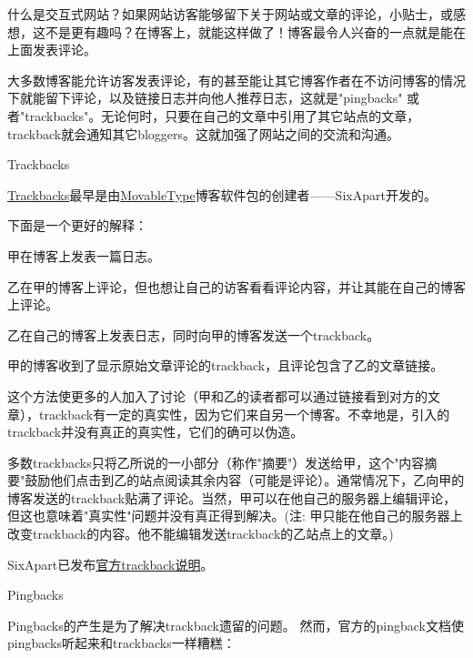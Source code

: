 什么是交互式网站？如果网站访客能够留下关于网站或文章的评论，小贴士，或感想，这不是更有趣吗？在博客上，就能这样做了！博客最令人兴奋的一点就是能在上面发表评论。

大多数博客能允许访客发表评论，有的甚至能让其它博客作者在不访问博客的情况下就能留下评论，以及链接日志并向他人推荐日志，这就是"pingbacks" 或者"trackbacks"。无论何时，只要在自己的文章中引用了其它站点的文章， trackback就会通知其它bloggers。这就加强了网站之间的交流和沟通。

\begin{compactenum}
\item Trackbacks

\href{http://codex.wordpress.org/Glossary#Trackback}{Trackbacks}最早是由\href{http://www.movabletype.org/}{MovableType}博客软件包的创建者——SixApart开发的。


下面是一个更好的解释：
\begin{compactitem}
\item 甲在博客上发表一篇日志。
\item 乙在甲的博客上评论，但也想让自己的访客看看评论内容，并让其能在自己的博客上评论。
\item 乙在自己的博客上发表日志，同时向甲的博客发送一个trackback。
\item 甲的博客收到了显示原始文章评论的trackback，且评论包含了乙的文章链接。
\end{compactitem}

这个方法使更多的人加入了讨论（甲和乙的读者都可以通过链接看到对方的文章），trackback有一定的真实性，因为它们来自另一个博客。不幸地是，引入的trackback并没有真正的真实性，它们的确可以伪造。

多数trackbacks只将乙所说的一小部分（称作"摘要"）发送给甲，这个"内容摘要"鼓励他们点击到乙的站点阅读其余内容（可能是评论）。通常情况下，乙向甲的博客发送的trackback贴满了评论。当然，甲可以在他自己的服务器上编辑评论，但这也意味着"真实性"问题并没有真正得到解决。(注: 甲只能在他自己的服务器上改变trackback的内容。他不能编辑发送trackback的乙站点上的文章。)

SixApart已发布\href{http://www.movabletype.org/docs/mttrackback.html}{官方trackback说明}。

\item Pingbacks

Pingbacks的产生是为了解决trackback遗留的问题。 然而，官方的pingback文档使pingbacks听起来和trackbacks一样糟糕：


\end{compactenum}
